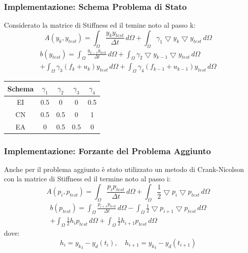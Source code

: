 \documentclass{beamer}
\theoremstyle{definition}
\theoremstyle{remark}
\theoremstyle{plain}
\theoremstyle{definition}
\begin{document}
\begin{frame}
\frametitle{Implementazione: Schema Problema di Stato}
Considerato la matrice di Stiffness ed il temine noto al passo k:
\begin{equation*}
A(y_k,y_{test}) =  \int_{\Omega} \frac{y_ky_{test}}{{\Delta}t} \, d\Omega + \int_{\Omega} \gamma_1 \bigtriangledown y_k \bigtriangledown y_{test} \, d\Omega 
\end{equation*}
\begin{multline*}
b(y_{test}) = \int_{\Omega} \frac{y_{k-1}y_{test}}{{\Delta}t} \, d\Omega + \int_{\Omega} \gamma_2 \bigtriangledown y_{k-1} \bigtriangledown y_{test} \, d\Omega \\+ \int_{\Omega} \gamma_3 (f_{k}+u_k)y_{test} \, d\Omega + \int_{\Omega} \gamma_4 (f_{k-1}+u_{k-1})y_{test} \, d\Omega
\end{multline*}

\begin{table}
\centering
\begin{tabular}{|c|c|c|c|c|}
\hline
\textbf{Schema} & \textbf{$\gamma_1$} &\textbf{$\gamma_2$} & \textbf{$\gamma_3$} &\textbf{$\gamma_4$} \\
\hline
EI & 0.5 & 0 & 0 & 0.5 \\
\hline
CN & 0.5 & 0.5 & 0 & 1 \\
\hline
EA & 0 & 0.5 & 0.5 & 0\\
\hline
\end{tabular}
\end{table}
\end{frame}

\begin{frame}
\frametitle{Implementazione: Forzante del Problema Aggiunto}
Anche per il problema aggiunto è stato utilizzato un metodo di Crank-Nicolson con la matrice di Stiffness ed il termine noto al passo i:
\begin{equation*}
A(p_i,p_{test}) = \int_{\Omega} \frac{p_ip_{test}}{{\Delta}t} \, d\Omega + \int_{\Omega} \frac{1}{2}\bigtriangledown p_i \bigtriangledown p_{test} \, d\Omega 
\end{equation*}
\begin{multline*}
b(p_{test}) = \int_{\Omega} \frac{p_{i+1}p_{test}}{{\Delta}t} \, d\Omega - \int_{\Omega} \frac{1}{2} \bigtriangledown p_{i+1} \bigtriangledown p_{test} \, d\Omega \\+ \int_{\Omega} \frac{1}{2} h_i p_{test} \, d\Omega + \int_{\Omega} \frac{1}{2} h_{i+1} p_{test} \, d\Omega
\end{multline*}
dove:
\begin{equation*}
h_i = {y_k}_i - y_d(t_i), \quad
h_{i+1} = {y_k}_i - y_d(t_{i+1})
\end{equation*}

\end{frame}
\end{document}
